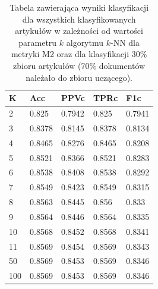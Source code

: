 \documentclass{classrep}
\begin{document}
\begin{table}[H]
    \centering
\caption{Tabela zawierająca wyniki klasyfikacji dla wszystkich klasyfikowanych artykułów w zależności od wartości parametru $k$ algorytmu $k$-NN dla metryki M2 oraz dla klasyfikacji 30\% zbioru artykułów (70\% dokumentów należało do zbioru uczącego).}
\begin{adjustbox}{max width=\textwidth}
    \begin{tabular}{|l|l|l|l|l|}
    \hline
        K & Acc & PPVc & TPRc & F1c \\ \hline
        2 & 0.825 & 0.7942 & 0.825 & 0.7941 \\ \hline
        3 & 0.8378 & 0.8145 & 0.8378 & 0.8134 \\ \hline
        4 & 0.8465 & 0.8276 & 0.8465 & 0.8208 \\ \hline
        5 & 0.8521 & 0.8366 & 0.8521 & 0.8283 \\ \hline
        6 & 0.8538 & 0.8408 & 0.8538 & 0.8292 \\ \hline
        7 & 0.8549 & 0.8423 & 0.8549 & 0.8315 \\ \hline
        8 & 0.8563 & 0.8445 & 0.856 & 0.833 \\ \hline
        9 & 0.8564 & 0.8446 & 0.8564 & 0.8335 \\ \hline
        10 & 0.8568 & 0.8452 & 0.8568 & 0.8341 \\ \hline
        11 & 0.8569 & 0.8454 & 0.8569 & 0.8343 \\ \hline
        50 & 0.8569 & 0.8453 & 0.8569 & 0.8346 \\ \hline
        100 & 0.8569 & 0.8453 & 0.8569 & 0.8346 \\ \hline
    \end{tabular}
\end{adjustbox}
\end{table}
\end{document}

